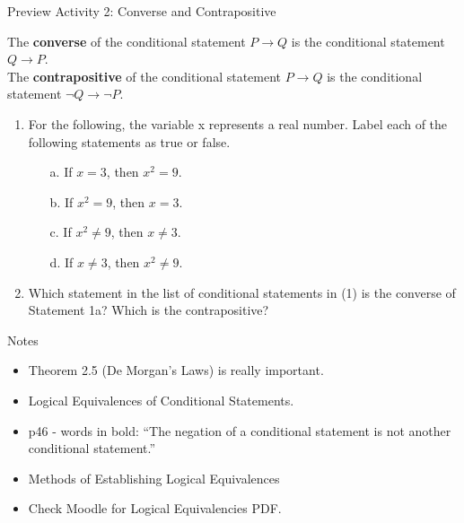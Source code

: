 \documentclass{beamer}
\begin{document}
\begin{frame}{Preview Activity 2: Converse and Contrapositive}
	\begin{definition}
		The \textbf{converse} of the conditional statement $P \to Q$ is the conditional
		statement $Q \to P$.\\
		
		The \textbf{contrapositive} of the conditional statement $P \to Q$ is the conditional
		statement $\neg Q \to \neg  P$.
	\end{definition}
	\begin{enumerate}
		\item For the following, the variable x represents a real number. Label each of the
		following statements as true or false.
		\begin{multicols}{2}
			\begin{enumerate}
				\item[a.] If $x = 3$, then $x^2 = 9$.
				\item[b.] If $x^2 = 9$, then $x = 3$.
				\item[c.] If $x^2 \not = 9$, then $x \not = 3$.
				\item[d.] If $x \not = 3$, then $x^2 \not = 9$. \pause
			\end{enumerate}
		\end{multicols}
		\item Which statement in the list of conditional statements in (1) is the converse
		of Statement 1a? Which is the contrapositive?
	\end{enumerate}
\end{frame}



\begin{frame}{Notes}
	\begin{itemize}
		\item Theorem 2.5 (De Morgan's Laws) is really important.\\[.2 in] \pause
		\item Logical Equivalences of Conditional Statements.\\[.2 in] \pause
		\item p46 - words in bold: ``The negation of a conditional statement is not another conditional statement.''\\[.2 in] \pause
		\item Methods of Establishing Logical Equivalences\\[.2 in] \pause
		\item Check Moodle for Logical Equivalencies PDF.
	\end{itemize}
\end{frame}
\end{document}
